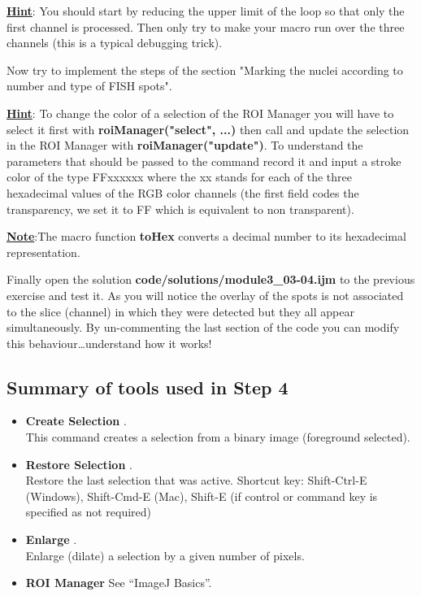 \underline{\textbf{Hint}}: You should start by reducing the upper limit of the loop so that only the first channel is processed. Then only try to make your macro run over the three channels (this is a typical debugging trick).

Now try to implement the steps of the section "Marking the nuclei according to number and type of FISH spots".

\underline{\textbf{Hint}}: To change the color of a selection of the ROI Manager you will have to select it first with \textbf{roiManager("select", ...)} then call  and update the selection in the ROI Manager with \textbf{roiManager("update")}. To understand the parameters that should be passed to the command record it and input a stroke color of the type FFxxxxxx where the xx stands for each of the three hexadecimal values of the RGB color channels (the first field codes the transparency, we set it to FF which is equivalent to non transparent).

\underline{\textbf{Note}}:The macro function \textbf{toHex} converts a decimal number to its hexadecimal representation.

Finally open the solution \textbf{code/solutions/module3\_03-04.ijm} to the previous exercise and test it. As you will notice the overlay of the spots is not associated to the slice (channel) in which they were detected but they all appear simultaneously. By un-commenting the last section of the code you can modify this behaviour\ldots understand how it works!

\subsection{Summary of tools used in Step 4}

\begin{itemize}
\item \textbf{Create Selection} .\\
This command creates a selection from a binary image (foreground selected).

\item \textbf{Restore Selection} .\\
Restore the last selection that was active. Shortcut key: Shift-Ctrl-E (Windows), Shift-Cmd-E (Mac), Shift-E (if control or command key is specified as not required)

\item \textbf{Enlarge} .\\
Enlarge (dilate) a selection by a given number of pixels.

\item \textbf{ROI Manager} See ``ImageJ Basics''.

\end{itemize}

\newpage
